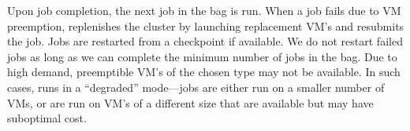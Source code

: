 Upon job completion, the next job in the bag is run. 
When a job fails due to VM preemption, \sysname replenishes the cluster by launching replacement VM's and resubmits the job. 
Jobs are restarted from a checkpoint if available.
We do not restart failed jobs as long as we can complete the minimum number of jobs in the bag.
Due to high demand, preemptible VM's of the chosen type may not be available.
In such cases, \sysname runs in a ``degraded'' mode---jobs are either run on a smaller number of VMs, or are run on VM's of a different size that are available but may have suboptimal cost.  

